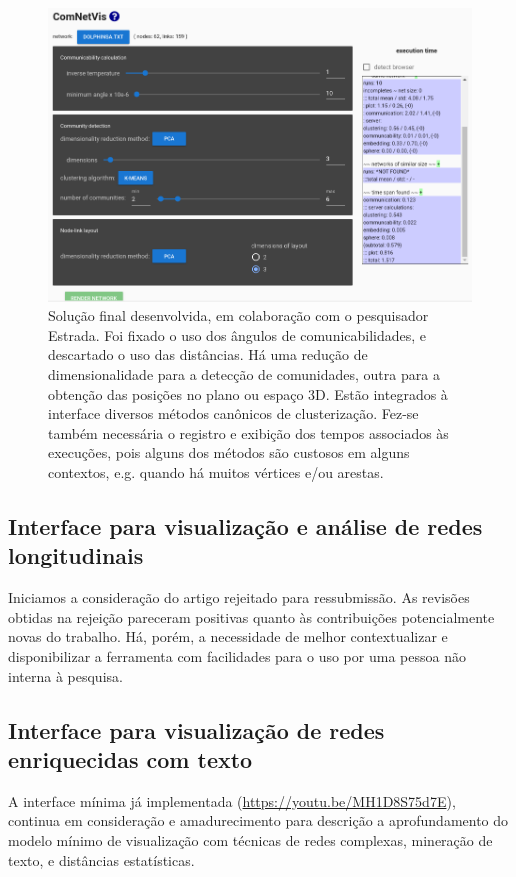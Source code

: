 \documentclass[a4paper, 11pt]{article}
\begin{document}
\begin{figure}[h!]
\centering
  \includegraphics[width=0.8\linewidth]{com}
\caption{%
  Solução final desenvolvida, em colaboração com o pesquisador Estrada.
  Foi fixado o uso dos ângulos de comunicabilidades, e descartado o uso das distâncias.
  Há uma redução de dimensionalidade para a detecção de comunidades,
  outra para a obtenção das posições no plano ou espaço 3D.
  Estão integrados à interface diversos métodos canônicos de clusterização.
  Fez-se também necessária o registro e exibição dos tempos associados às execuções,
  pois alguns dos métodos são custosos em alguns contextos,
  e.g. quando há muitos vértices e/ou arestas.
}\label{com}
\end{figure}


\subsection{Interface para visualização e análise de redes longitudinais}\label{sevo}
Iniciamos a consideração do artigo rejeitado para ressubmissão.
As revisões obtidas na rejeição pareceram positivas quanto às contribuições potencialmente
novas do trabalho. Há, porém, a necessidade de melhor contextualizar e disponibilizar a ferramenta
com facilidades para o uso por uma pessoa não interna à pesquisa.

\subsection{Interface para visualização de redes enriquecidas com texto}
A interface mínima já implementada (\url{https://youtu.be/MH1D8S75d7E}),
continua em consideração e amadurecimento para descrição a aprofundamento
do modelo mínimo de visualização com técnicas de redes complexas, mineração
de texto, e distâncias estatísticas.
\end{document}
